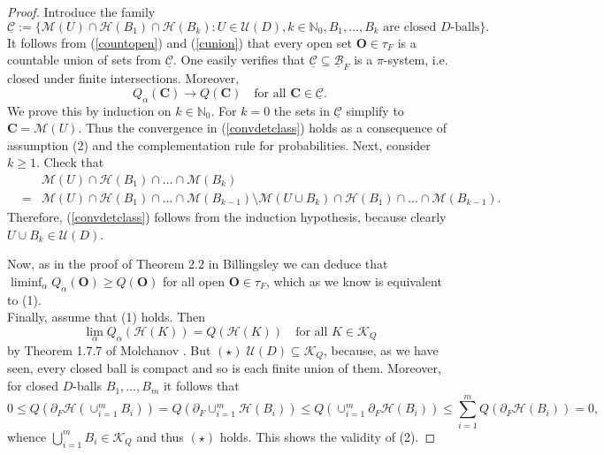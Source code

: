 \documentclass[sn-mathphys,Numbered]{sn-jnl}%
\theoremstyle{thmstyleone}%
\theoremstyle{thmstyletwo}%
\theoremstyle{thmstylethree}%
\begin{document}
\begin{proof}
Introduce the family
$$
 \underline{\mathcal{C}} := \{\mathcal{M}(U) \cap \mathcal{H}(B_1)\cap \mathcal{H}(B_k):U \in \mathcal{U}(D), k \in \mathbb{N}_0, B_1, \ldots, B_k \text{ are closed } D\text{-balls} \}.
$$
It follows from (\ref{countopen}) and (\ref{cunion}) that every open set $\textbf{O} \in \tau_F$ is a countable union
of sets from $\underline{\mathcal{C}}$. One easily verifies that $\underline{\mathcal{C}} \subseteq \underline{\mathcal{B}}_F$ is a $\pi$-system, i.e. closed under finite intersections. Moreover,
\begin{equation} \label{convdetclass}
 Q_\alpha(\textbf{C}) \rightarrow Q(\textbf{C}) \quad \text{for all } \textbf{C} \in \underline{\mathcal{C}}.
\end{equation}
We prove this by induction on $k \in \mathbb{N}_0$. For $k=0$ the sets in $\underline{\mathcal{C}}$ simplify to $\textbf{C}=\mathcal{M}(U)$. Thus the
convergence in (\ref{convdetclass}) holds as a consequence of assumption (2) and the complementation rule for probabilities. Next, consider $k \ge 1$. Check that
\begin{eqnarray*}
 & &\mathcal{M}(U) \cap \mathcal{H}(B_1) \cap \ldots \cap \mathcal{M}(B_k)\\
 &=&\mathcal{M}(U) \cap \mathcal{H}(B_1) \cap \ldots \cap \mathcal{M}(B_{k-1}) \setminus \mathcal{M}(U \cup B_k) \cap \mathcal{H}(B_1) \cap \ldots \cap \mathcal{M}(B_{k-1}).
\end{eqnarray*}
Therefore, (\ref{convdetclass}) follows from the induction hypothesis, because clearly $U \cup B_k \in \mathcal{U}(D)$.

Now, as in the proof of Theorem 2.2 in Billingsley \cite{Bill} we can deduce that $\liminf_\alpha Q_\alpha(\textbf{O}) \ge Q(\textbf{O})$ for all
open $\textbf{O} \in \tau_F$, which as we know is equivalent to (1).\\

Finally, assume that (1) holds. Then
$$
 \lim_\alpha Q_\alpha(\mathcal{H}(K))=Q(\mathcal{H}(K)) \quad \text{for all }  K \in \mathcal{K}_Q
$$
by Theorem 1.7.7 of Molchanov \cite{Molchanov}. But $(\star) \; \mathcal{U}(D) \subseteq \mathcal{K}_Q$, because, as we have seen, every closed ball is compact
and so is each finite union of them. Moreover, for closed $D$-balls $B_1,\ldots,B_m$ it follows that
$$
 0 \le Q(\partial_F \mathcal{H}(\cup_{i=1}^m B_i))= Q(\partial_F \cup_{i=1}^m \mathcal{H}(B_i)) \le Q(\cup_{i=1}^m \partial_F \mathcal{H}(B_i)) \le \sum_{i=1}^m Q(\partial_F \mathcal{H}(B_i))=0,
$$
whence $\bigcup_{i=1}^m B_i \in \mathcal{K}_Q$ and thus $(\star)$ holds.
This shows the validity of (2).
\end{proof}
\end{document}
